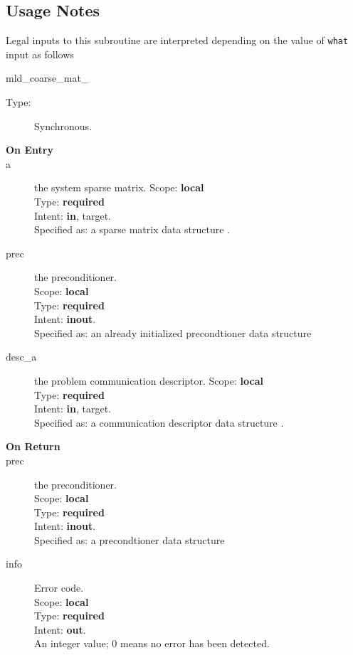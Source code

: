 \subsection*{Usage Notes}
Legal inputs to this subroutine are interpreted depending on the value
of \verb|what| input as follows
\begin{description}
\item[mld\_coarse\_mat\_] 
\end{description}




\begin{description}
\item[Type:] Synchronous.
\item[\bf On Entry]
\item[a] the system sparse matrix.
Scope: {\bf local} \\
Type: {\bf required}\\
Intent: {\bf in}, target.\\
Specified as: a sparse matrix data structure \spdata.
\item[prec] the preconditioner.\\
Scope: {\bf local} \\
Type: {\bf required}\\
Intent: {\bf inout}.\\
Specified as: an already initialized precondtioner data structure \precdata\\
\item[desc\_a] the problem communication descriptor. 
Scope: {\bf local} \\
Type: {\bf required}\\
Intent: {\bf in}, target.\\
Specified as: a communication descriptor data structure \descdata.
\end{description}

\begin{description}
\item[\bf On Return]
\item[prec] the preconditioner.\\
Scope: {\bf local} \\
Type: {\bf required}\\
Intent: {\bf inout}.\\
Specified as: a precondtioner data structure \precdata\\
\item[info] Error code.\\
Scope: {\bf local} \\
Type: {\bf required} \\
Intent: {\bf out}.\\
An integer value; 0 means no error has been detected. 
\end{description}



